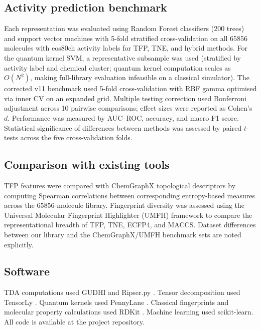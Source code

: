 \documentclass[11pt,a4paper]{article}
\begin{document}
\subsection{Activity prediction benchmark}

Each representation was evaluated using Random Forest classifiers (200 trees) and support vector machines with 5-fold stratified cross-validation on all \num{65856} molecules with eos80ch activity labels for TFP, TNE, and hybrid methods. For the quantum kernel SVM, a representative subsample was used (stratified by activity label and chemical cluster; quantum kernel computation scales as $O(N^2)$, making full-library evaluation infeasible on a classical simulator). The corrected v11 benchmark used 5-fold cross-validation with RBF gamma optimised via inner CV on an expanded grid. Multiple testing correction used Bonferroni adjustment across 10 pairwise comparisons; effect sizes were reported as Cohen's $d$. Performance was measured by AUC--ROC, accuracy, and macro F1 score. Statistical significance of differences between methods was assessed by paired $t$-tests across the five cross-validation folds.

\subsection{Comparison with existing tools}

TFP features were compared with ChemGraphX topological descriptors \citep{chemgraphx_2026} by computing Spearman correlations between corresponding entropy-based measures across the \num{65856}-molecule library. Fingerprint diversity was assessed using the Universal Molecular Fingerprint Highlighter (UMFH) framework \citep{umfh_2026} to compare the representational breadth of TFP, TNE, ECFP4, and MACCS. Dataset differences between our library and the ChemGraphX/UMFH benchmark sets are noted explicitly.

\subsection{Software}

TDA computations used GUDHI \citep{gudhi_2024} and Ripser.py \citep{ripser_2019}. Tensor decomposition used TensorLy \citep{tensorly_2019}. Quantum kernels used PennyLane \citep{pennylane_2024}. Classical fingerprints and molecular property calculations used RDKit \citep{rdkit_2024}. Machine learning used scikit-learn. All code is available at the project repository.
\end{document}

